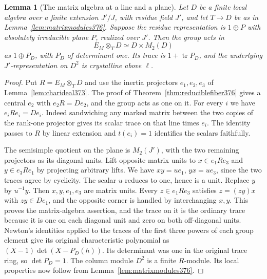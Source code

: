 \documentclass[a4paper,11pt]{article}
\newtheorem{lemma}[proposition]{Lemma}
\theoremstyle{definition}
\theoremstyle{remark}
\numberwithin{equation}{section}
\begin{document}
\begin{lemma}[The matrix algebra at a line and a plane]
\label{lem:planeunits379}
Let \(D\) be a finite local algebra over a finite extension
\(J'/J\), with residue field \(J'\), and let \(T\to D\) be as
in Lemma~\ref{lem:matrixmodules376}. Suppose the residue
representation is \(1\oplus P\) with absolutely irreducible
plane \(P\), realized over \(J'\). Then the group acts in
\[
              E_M\otimes_T D\simeq D\times M_2(D)
\]
as \(1\oplus P_D\), with \(P_D\) of determinant one.
Its trace is \(1+\operatorname{tr}P_D\), and the underlying
\(J'\)-representation on \(D^2\) is crystalline above \(\ell\).
\end{lemma}
\begin{proof}
Put \(R=E_M\otimes_T D\) and use the inertia projectors
\(e_1,e_2,e_3\) of Lemma~\ref{lem:charideal373}. The proof of
Theorem~\ref{thm:reduciblefiber376} gives a central \(e_2\)
with \(e_2R=De_2\), and the group acts as one on it.
For every \(i\) we have \(e_i R e_i=De_i\). Indeed sandwiching
any marked matrix between the two copies of the rank-one
projector gives its scalar trace on that line times \(e_i\).
The identity passes to \(R\) by linear extension and
\(t(e_i)=1\) identifies the scalars faithfully.

The semisimple quotient on the plane is \(M_2(J')\), with
the two remaining projectors as its diagonal units. Lift
opposite matrix units to \(x\in e_1Re_3\) and
\(y\in e_3Re_1\) by projecting arbitrary lifts. We have
\(xy=u e_1\), \(yx=u e_3\), since the two traces agree by
cyclicity. The scalar \(u\) reduces to one, hence is a unit.
Replace \(y\) by \(u^{-1}y\). Then \(x,y,e_1,e_3\) are
matrix units. Every \(z\in e_1Re_3\) satisfies
\(z=(zy)x\) with \(zy\in De_1\), and the opposite corner
is handled by interchanging \(x,y\). This proves the
matrix-algebra assertion, and the trace on it is the
ordinary trace because it is one on each diagonal unit and
zero on both off-diagonal units. Newton's identities applied
to the traces of the first three powers of each group
element give its original characteristic polynomial as
\((X-1)\det(X-P_D(h))\). Its determinant was one in the
original trace ring, so \(\det P_D=1\). The column module
\(D^2\) is a finite \(R\)-module. Its local properties now
follow from Lemma~\ref{lem:matrixmodules376}.
\end{proof}
\end{document}
